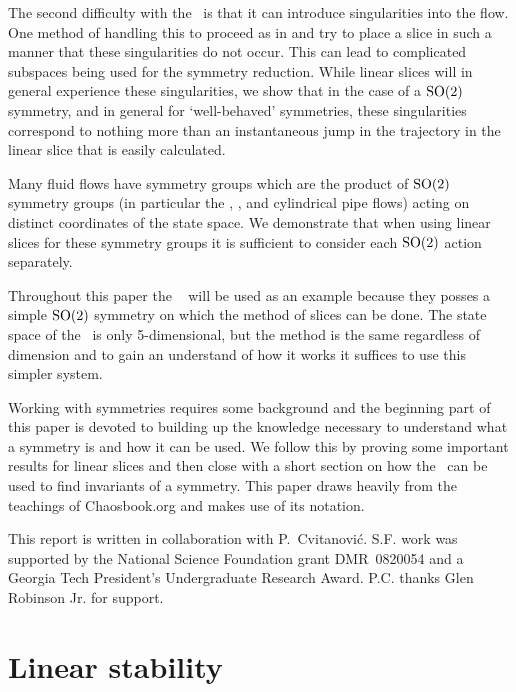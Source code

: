 The second difficulty with the \mslices\ is that it can introduce singularities into the flow. One method of handling this to proceed as in  and try to place a slice in such a manner that these singularities do not occur. This can lead to complicated subspaces being used for the symmetry reduction. While linear slices will in general experience these singularities, we show that in the case of a $\textrm{SO}(2)$ symmetry, and in general for `well-behaved' symmetries, these singularities correspond to nothing more than an instantaneous jump in the trajectory in the linear slice that is easily calculated.

Many fluid flows have symmetry groups which are the product of $\textrm{SO}(2)$ symmetry groups (in particular the \KS, {\pCf}, and cylindrical pipe flows) acting on distinct coordinates of the state space. We demonstrate that when using linear slices for these symmetry groups it is sufficient to consider each $\textrm{SO}(2)$ action separately.

Throughout this paper the \cLe\  will be used as an example because they posses a simple $\textrm{SO}(2)$ symmetry on which the method of slices can be done. The state space of the \cLe\ is only 5-dimensional, but the method is the same regardless of dimension and to gain an understand of how it works it suffices to use this simpler system.

Working with symmetries requires some background and the beginning part of this paper is devoted to building up the knowledge necessary to understand what a symmetry is and how it can be used. We follow this by proving some important results for linear slices and then close with a short section on how the \mslices\ can be used to find invariants of a symmetry. This paper draws heavily from the teachings of Chaosbook.org and makes use of its notation.

This report is written in collaboration with
P.~Cvitanovi\'c.
S.F. work was supported by the National Science Foundation
grant DMR~0820054 and a Georgia Tech President's Undergraduate
Research Award.
P.C. thanks Glen Robinson Jr. for support. 	

    \ifarticle
    \else

\section{Linear stability}
\label{sect:stability}

